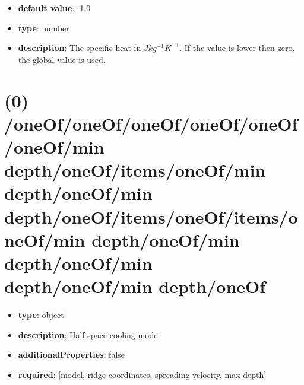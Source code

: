 \begin{itemize}[leftmargin=1em]\item {\bf default value}: -1.0
\item {\bf type}: number
\item {\bf description}: The specific heat in $J kg^{-1} K^{-1}$. If the value is lower then zero, the global value is used.
\end{itemize}\section{(0) /oneOf/oneOf/oneOf/oneOf/oneOf/oneOf/min depth/oneOf/items/oneOf/min depth/oneOf/min depth/oneOf/items/oneOf/items/oneOf/min depth/oneOf/min depth/oneOf/min depth/oneOf/min depth/oneOf}
\begin{itemize}[leftmargin=0em]\item {\bf type}: object
\item {\bf description}: Half space cooling mode
\item {\bf additionalProperties}: false
\item {\bf required}: [model, ridge coordinates, spreading velocity, max depth]\end{itemize}
